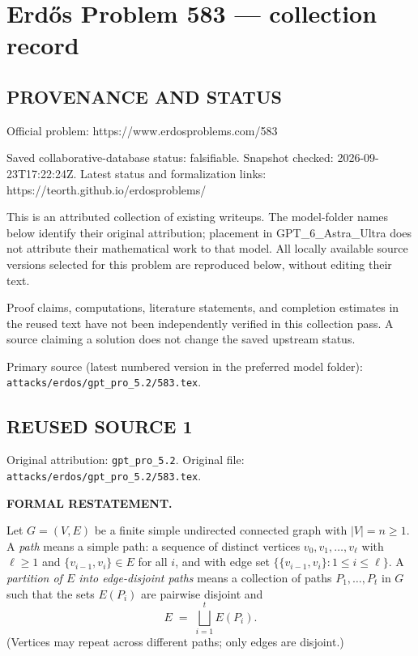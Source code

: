 \section*{Erd\H{o}s Problem 583 --- collection record}

\subsection*{PROVENANCE AND STATUS}
Official problem: https://www.erdosproblems.com/583

Saved collaborative-database status: falsifiable.
Snapshot checked: 2026-09-23T17:22:24Z.
Latest status and formalization links: https://teorth.github.io/erdosproblems/

This is an attributed collection of existing writeups. The model-folder names below identify their original attribution; placement in GPT\_6\_Astra\_Ultra does not attribute their mathematical work to that model. All locally available source versions selected for this problem are reproduced below, without editing their text.

Proof claims, computations, literature statements, and completion estimates in the reused text have not been independently verified in this collection pass. A source claiming a solution does not change the saved upstream status.

Primary source (latest numbered version in the preferred model folder): \texttt{attacks/erdos/gpt\_pro\_5.2/583.tex}.

\subsection*{REUSED SOURCE 1}
Original attribution: \texttt{gpt\_pro\_5.2}.
Original file: \texttt{attacks/erdos/gpt\_pro\_5.2/583.tex}.



\noindent\textbf{FORMAL RESTATEMENT.}

Let $G=(V,E)$ be a finite simple undirected connected graph with $|V|=n\ge 1$.
A \emph{path} means a simple path: a sequence of distinct vertices $v_0,v_1,\dots,v_\ell$ with $\ell\ge 1$ and $\{v_{i-1},v_i\}\in E$ for all $i$, and with edge set $\{\{v_{i-1},v_i\}:1\le i\le \ell\}$.
A \emph{partition of $E$ into edge-disjoint paths} means a collection of paths $P_1,\dots,P_t$ in $G$ such that the sets $E(P_i)$ are pairwise disjoint and
\[
E\;=\;\bigsqcup_{i=1}^t E(P_i).
\]
(Vertices may repeat across different paths; only edges are disjoint.)

